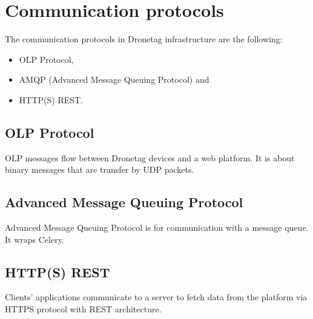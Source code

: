 \section{Communication protocols}\label{sec:communication-protocols}
The communication protocols in Dronetag infrastructure are the following:
\begin{itemize}
    \item OLP Protocol,
    \item AMQP (Advanced Message Queuing Protocol) and
    \item HTTP(S) REST.\cite{dataInfrastructure}
\end{itemize}

\subsection{OLP Protocol}\label{subsec:olp-protocol}
OLP messages flow between Dronetag devices and a web platform.
It is about binary messages that are transfer by UDP packets.\cite{dataInfrastructure}

\subsection{Advanced Message Queuing Protocol}\label{subsec:advanced-message-queuing-protocol}
Advanced Message Queuing Protocol is for communication with a message queue.
It wraps Celery.\cite{dataInfrastructure}

\subsection{HTTP(S) REST}\label{subsec:httpnullsnullrest}
Clients' applications communicate to a server to fetch data from the platform via HTTPS protocol with REST architecture.\cite{dataInfrastructure}
